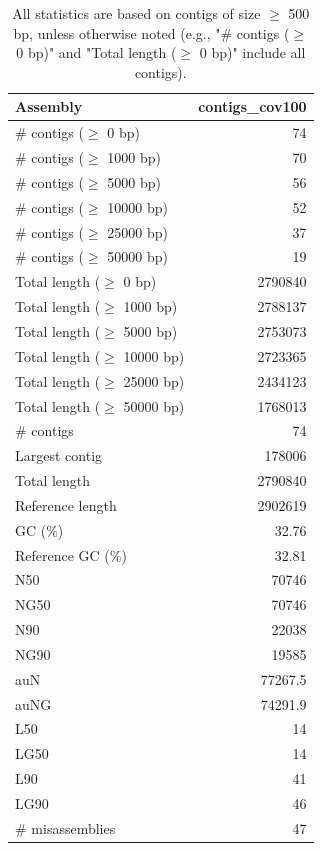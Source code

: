 \documentclass[12pt,a4paper]{article}
\begin{document}
\begin{table}[ht]
\begin{center}
\caption{All statistics are based on contigs of size $\geq$ 500 bp, unless otherwise noted (e.g., "\# contigs ($\geq$ 0 bp)" and "Total length ($\geq$ 0 bp)" include all contigs).}
\begin{tabular}{|l*{1}{|r}|}
\hline
Assembly & contigs\_cov100 \\ \hline
\# contigs ($\geq$ 0 bp) & 74 \\ \hline
\# contigs ($\geq$ 1000 bp) & 70 \\ \hline
\# contigs ($\geq$ 5000 bp) & 56 \\ \hline
\# contigs ($\geq$ 10000 bp) & 52 \\ \hline
\# contigs ($\geq$ 25000 bp) & 37 \\ \hline
\# contigs ($\geq$ 50000 bp) & 19 \\ \hline
Total length ($\geq$ 0 bp) & 2790840 \\ \hline
Total length ($\geq$ 1000 bp) & 2788137 \\ \hline
Total length ($\geq$ 5000 bp) & 2753073 \\ \hline
Total length ($\geq$ 10000 bp) & 2723365 \\ \hline
Total length ($\geq$ 25000 bp) & 2434123 \\ \hline
Total length ($\geq$ 50000 bp) & 1768013 \\ \hline
\# contigs & 74 \\ \hline
Largest contig & 178006 \\ \hline
Total length & 2790840 \\ \hline
Reference length & 2902619 \\ \hline
GC (\%) & 32.76 \\ \hline
Reference GC (\%) & 32.81 \\ \hline
N50 & 70746 \\ \hline
NG50 & 70746 \\ \hline
N90 & 22038 \\ \hline
NG90 & 19585 \\ \hline
auN & 77267.5 \\ \hline
auNG & 74291.9 \\ \hline
L50 & 14 \\ \hline
LG50 & 14 \\ \hline
L90 & 41 \\ \hline
LG90 & 46 \\ \hline
\# misassemblies & 47 \\ \hline

\end{tabular}
\end{center}
\end{table}
\end{document}
